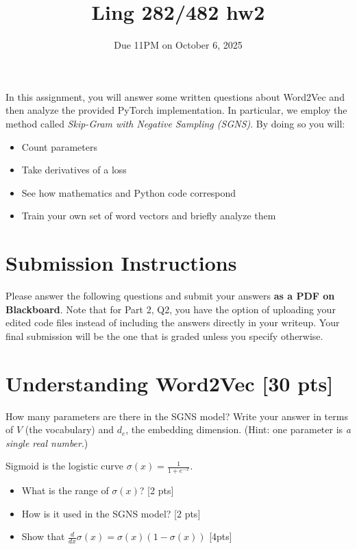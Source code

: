 \documentclass[11pt]{article}
\begin{document}
\title{Ling 282/482 hw2}
\date{\vspace{-0.2in}Due 11PM on October 6, 2025}
\maketitle


In this assignment, you will answer some written questions about Word2Vec and then analyze the provided PyTorch implementation. In particular, we employ  the method called \emph{Skip-Gram with Negative Sampling (SGNS)}. By doing so you will:
\begin{itemize}
  \item Count parameters
  \item Take derivatives of a loss
  \item See how mathematics and Python code correspond
  \item Train your own set of word vectors and briefly analyze them
\end{itemize}

\section*{Submission Instructions}
\noindent Please answer the following questions and submit your answers \textbf{as a PDF on Blackboard}. Note that for Part 2, Q2, you have the option of uploading your edited code files instead of including the answers directly in your writeup. Your final submission will be the one that is graded unless you specify otherwise.


\section{Understanding Word2Vec [30 pts]}

  How many parameters are there in the SGNS model?  Write your answer in terms of $V$ (the vocabulary) and $d_e$, the embedding dimension.  (Hint: one parameter is \emph{a single real number}.)

\vspace{2em}
  Sigmoid is the logistic curve $\sigma(x) = \frac{1}{1+e^{-x}}$.
\begin{itemize}
  \item What is the range of $\sigma(x)$? [2 pts]
  \item How is it used in the SGNS model? [2 pts]
  \item Show that $\frac{d}{dx}\sigma(x) = \sigma(x)(1-\sigma(x))$ [4pts]
\end{itemize}
\end{document}
